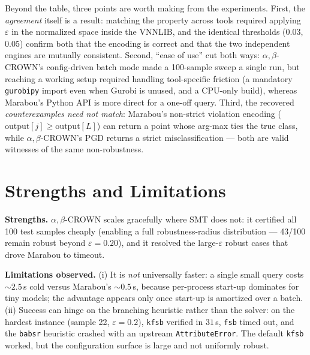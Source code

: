 \documentclass[10pt]{article}
\newcommand{\abc}{$\alpha,\beta$-CROWN}
\newcommand{\eps}{$\varepsilon$}
\begin{document}
Beyond the table, three points are worth making from the experiments. First, the
\emph{agreement} itself is a result: matching the property across tools required applying
\eps{} in the normalized space inside the VNNLIB, and the identical thresholds ($0.03$,
$0.05$) confirm both that the encoding is correct and that the two independent engines are
mutually consistent. Second, ``ease of use'' cut both ways: \abc{}'s config-driven batch mode
made a 100-sample sweep a single run, but reaching a working setup required handling
tool-specific friction (a mandatory \texttt{gurobipy} import even when Gurobi is unused, and a
CPU-only build), whereas Marabou's Python API is more direct for a one-off query. Third, the
recovered \emph{counterexamples need not match}: Marabou's non-strict violation encoding
($\text{output}[j]\ge\text{output}[L]$) can return a point whose arg-max ties the true class,
while \abc{}'s PGD returns a strict misclassification --- both are valid witnesses of the same
non-robustness.

\section{Strengths and Limitations}
\textbf{Strengths.} \abc{} scales gracefully where SMT does not: it certified all 100 test
samples cheaply (enabling a full robustness-radius distribution --- 43/100 remain robust
beyond $\varepsilon=0.20$), and it resolved the large-\eps{} robust cases that drove Marabou
to timeout.

\textbf{Limitations observed.} (i) It is \emph{not} universally faster: a single small query
costs ${\sim}2.5$\,s cold versus Marabou's ${\sim}0.5$\,s, because per-process start-up
dominates for tiny models; the advantage appears only once start-up is amortized over a batch.
(ii) Success can hinge on the branching heuristic rather than the solver: on the hardest
instance (sample 22, $\varepsilon=0.2$), \texttt{kfsb} verified in $31$\,s, \texttt{fsb} timed
out, and the \texttt{babsr} heuristic crashed with an upstream \texttt{AttributeError}. The
default \texttt{kfsb} worked, but the configuration surface is large and not uniformly robust.
\end{document}
